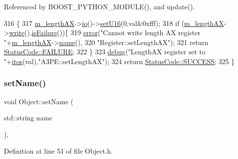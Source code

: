 Referenced by B\+O\+O\+S\+T\+\_\+\+P\+Y\+T\+H\+O\+N\+\_\+\+M\+O\+D\+U\+L\+E(), and update().


\begin{DoxyCode}
316                                             \{
317   \hyperlink{classA3PE_a87c93a38343873f2d52741deca4750ce}{m\_lengthAX}->\hyperlink{classIOobject_af04fb94137c3d86849f478ac5afab5d1}{io}()->\hyperlink{classIOdata_aa9ade5ce3944c8e2b831533b6f876caf}{setU16}(0,val&0xfff);
318   \textcolor{keywordflow}{if} (\hyperlink{classA3PE_a87c93a38343873f2d52741deca4750ce}{m\_lengthAX}->\hyperlink{classIOobject_a9f6984bc9f0fadcf800f1be2523ac744}{write}().\hyperlink{classStatusCode_a5dd22dc6eb2c52fc4cabc58f6dea2eb7}{isFailure}())\{
319     \hyperlink{classObject_a204a95f57818c0f811933917a30eff45}{error}(\textcolor{stringliteral}{"Cannot write length AX register "}+\hyperlink{classA3PE_a87c93a38343873f2d52741deca4750ce}{m\_lengthAX}->\hyperlink{classObject_a300f4c05dd468c7bb8b3c968868443c1}{name}(),
320         \textcolor{stringliteral}{"Register::setLengthAX"});
321     \textcolor{keywordflow}{return} \hyperlink{classStatusCode_a6f565cbeadc76d14c72f047e5e85eb4ba3da73d4c469762eb9d3c960368252b26}{StatusCode::FAILURE};
322   \}
323   \hyperlink{classObject_aac010553f022165573714b7014a15f0d}{debug}(\textcolor{stringliteral}{"LengthAX register set to "}+\hyperlink{Tools_8h_af330027dbdafb9a30768b3613c553e60}{itos}(val),\textcolor{stringliteral}{"A3PE::setLengthAX"});
324   \textcolor{keywordflow}{return} \hyperlink{classStatusCode_a6f565cbeadc76d14c72f047e5e85eb4badd0da38d3ba0d922efd1f4619bc37ad8}{StatusCode::SUCCESS};
325 \}
\end{DoxyCode}
\mbox{\label{classObject_ae30fea75683c2d149b6b6d17c09ecd0c}} 
\subsubsection{\texorpdfstring{set\+Name()}{setName()}}
{\footnotesize\ttfamily void Object\+::set\+Name (\begin{DoxyParamCaption}\item[{std\+::string}]{name }\end{DoxyParamCaption})\hspace{0.3cm}{\ttfamily [inline]}, {\ttfamily [inherited]}}



Definition at line 51 of file Object.\+h.



